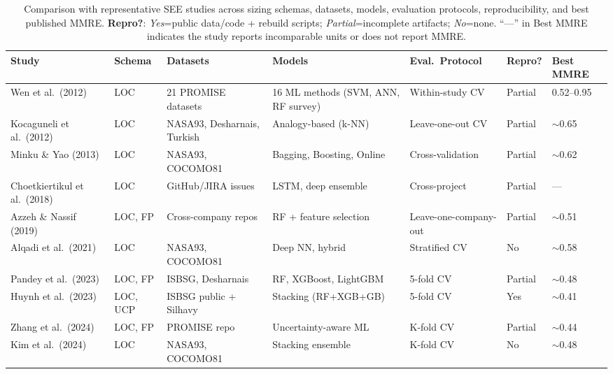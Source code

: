 \documentclass{ieeeaccess}
\begin{document}
\begin{table}[ht]
\centering
\setlength{\tabcolsep}{3.5pt}
\caption{Comparison with representative SEE studies across sizing schemas, datasets, models, evaluation protocols, reproducibility, and best published MMRE. \textbf{Repro?}: \textit{Yes}=public data/code + rebuild scripts; \textit{Partial}=incomplete artifacts; \textit{No}=none. ``---'' in Best MMRE indicates the study reports incomparable units or does not report MMRE.}
\label{tab:related-compare}
\footnotesize
\begin{tabular}{@{}p{2.5cm}p{1.2cm}p{2.4cm}p{2.3cm}p{2.3cm}p{0.9cm}p{1.5cm}@{}}
\toprule
\textbf{Study} & \textbf{Schema} & \textbf{Datasets} & \textbf{Models} & \textbf{Eval.\ Protocol} & \textbf{Repro?} & \textbf{Best MMRE} \\
\midrule
Wen et al.\ (2012)~\cite{wen2012systematic} & LOC & 21 PROMISE datasets & 16 ML methods (SVM, ANN, RF survey) & Within-study CV & Partial & 0.52--0.95 \\
Kocaguneli et al.\ (2012)~\cite{kocaguneli2013exploiting} & LOC & NASA93, Desharnais, Turkish & Analogy-based (k-NN) & Leave-one-out CV & Partial & $\sim$0.65 \\
Minku \& Yao (2013)~\cite{minku2013ensembles} & LOC & NASA93, COCOMO81 & Bagging, Boosting, Online & Cross-validation & Partial & $\sim$0.62 \\
Choetkiertikul et al.\ (2018)~\cite{choetkiertikul2018deep} & LOC & GitHub/JIRA issues & LSTM, deep ensemble & Cross-project & Partial & --- \\
Azzeh \& Nassif (2019)~\cite{azzeh2019cross} & LOC, FP & Cross-company repos & RF + feature selection & Leave-one-company-out & Partial & $\sim$0.51 \\
Alqadi et al.\ (2021)~\cite{alqadi2021deep} & LOC & NASA93, COCOMO81 & Deep NN, hybrid & Stratified CV & No & $\sim$0.58 \\
Pandey et al.\ (2023)~\cite{pandey2023comprehensive} & LOC, FP & ISBSG, Desharnais & RF, XGBoost, LightGBM & 5-fold CV & Partial & $\sim$0.48 \\
Huynh et al.\ (2023)~\cite{huynh2023stacking} & LOC, UCP & ISBSG public + Silhavy & Stacking (RF+XGB+GB) & 5-fold CV & Yes & $\sim$0.41 \\
Zhang et al.\ (2024)~\cite{zhang2024uncertainty} & LOC, FP & PROMISE repo & Uncertainty-aware ML & K-fold CV & Partial & $\sim$0.44 \\
Kim et al.\ (2024)~\cite{kim2024stacking} & LOC & NASA93, COCOMO81 & Stacking ensemble & K-fold CV & No & $\sim$0.48 \\

\end{tabular}
\end{table}
\end{document}
